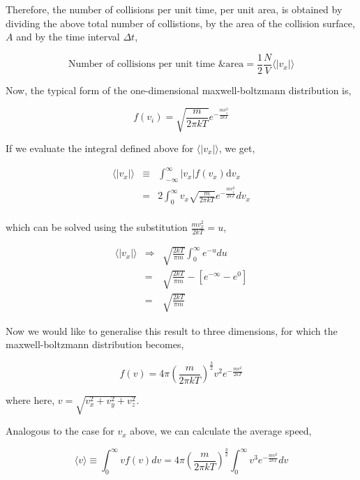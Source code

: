 \documentclass[11pt,a4paper,oneside]{article}
\begin{document}
Therefore, the number of collisions per unit time, per unit area, is obtained by dividing the above total number of collistions, by the area of the collision surface, $A$ and by the time interval $\Delta t$, 

\begin{equation}
\mbox{Number of collisions per unit time \& area} = \frac{1}{2}\frac{N}{V} \langle |v_{x}| \rangle
\label{eqn:numbercollisionsperunitareatime}
\end{equation}

Now, the typical form of the one-dimensional maxwell-boltzmann distribution is, 

\begin{equation}
f(v_{i}) = \sqrt{\frac{m}{2\pi k T}} e^{-\frac{mv_{i}^{2}}{2kT}}
\end{equation}

If we evaluate the integral defined above for $\langle |v_{x}| \rangle$, we get,

\begin{eqnarray*}
\langle |v_{x}| \rangle &\equiv& \int_{-\infty}^{\infty} |v_{x}|f(v_{x})\mathrm{d}v_{x} \\
&=& 2\int_{0}^{\infty} v_{x} \sqrt{\frac{m}{2\pi k T}} e^{-\frac{mv_{i}^{2}}{2kT}}  dv_{x} \\
\end{eqnarray*}

which can be solved using the substitution $\frac{mv_{x}^{2}}{2kT} = u$, 

\begin{eqnarray*}
\langle |v_{x}| \rangle &\Rightarrow& \sqrt{\frac{2kT}{\pi m}} \int_{0}^{\infty} e^{-u} du \\
&=& \sqrt{\frac{2kT}{\pi m}} -\left[e^{-\infty} - e^{0}\right] \\
&=& \sqrt{\frac{2kT}{\pi m}}
\end{eqnarray*}

Now we would like to generalise this result to three dimensions, for which the maxwell-boltzmann distribution becomes, 

\begin{equation}
f(v) = 4\pi \left(\frac{m}{2\pi k T}\right)^{\frac{3}{2}} v^{2} e^{-\frac{mv^{2}}{2kT}}
\end{equation}

where here, $v = \sqrt{v_{x}^{2} + v_{y}^{2} + v_{z}^{2}}$.

Analogous to the case for $v_{x}$ above, we can calculate the average speed, 

\begin{equation}
\langle v \rangle \equiv \int_{0}^{\infty} vf(v) dv =  4\pi \left(\frac{m}{2\pi k T}\right)^{\frac{3}{2}} \int_{0}^{\infty} v^{3} e^{-\frac{mv^{2}}{2kT}} dv
\end{equation}
\end{document}
